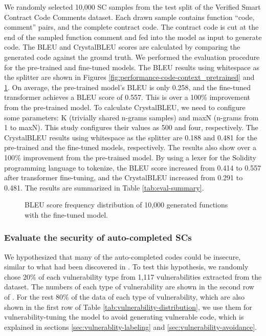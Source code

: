 \documentclass[12pt]{book}
\begin{document}
We randomly selected 10,000 SC samples from the test split of the Verified Smart Contract Code Comments dataset. Each drawn sample contains function ``code, comment'' pairs, and the complete contract code. The contract code is cut at the end of the sampled function comment and fed into the model as input to generate code. The BLEU and CrystalBLEU scores are calculated by comparing the generated code against the ground truth.  We performed the evaluation procedure for the pre-trained and fine-tuned models. The BLEU results using whitespace as the splitter are shown in Figures \ref{fig:performance-code-context_pretrained} and \ref{fig:performance-code-context_finetuned}. On average, the pre-trained model's BLEU is only 0.258, and the fine-tuned transformer achieves a BLEU score of 0.557. This is over a 100\% improvement from the pre-trained model. To calculate CrystalBLEU, we need to configure some parameters: K (trivially shared n-grams samples) and maxN (n-grams from 1 to maxN). This study configures their values as 500 and four, respectively. The CrystalBLEU results using whitespace as the splitter are 0.188 and 0.481 for the pre-trained and the fine-tuned models, respectively. The results also show over a 100\% improvement from the pre-trained model. By using a lexer for the Solidity programming language to tokenize, the BLEU score increased from 0.414 to 0.557 after transformer fine-tuning, and the CrystalBLEU increased from 0.291 to 0.481. The results are summarized in Table \ref{tab:eval-summary}. 


\begin{figure}[htp]
    \centering
    
    \caption{BLEU score frequency distribution of 10,000 generated functions with pre-trained model.}
    \label{fig:performance-code-context_pretrained}
    
    \caption{BLEU score frequency distribution of 10,000 generated functions with the fine-tuned model.}
    \label{fig:performance-code-context_finetuned}
\end{figure}


\subsubsection{Evaluate the security of auto-completed SCs}
\label{sec:eval-security-synthesis}
We hypothesized that many of the auto-completed codes could be insecure, similar to what had been discovered in \cite{chen2021codex}. To test this hypothesis, we randomly chose 20\% of each vulnerability type from 1,117 vulnerabilities extracted from the \cite{Hu2023} dataset. The numbers of each type of vulnerability are shown in the second row of . For the rest 80\% of the data of each type of vulnerability, which are also shown in the first row of Table \ref{tab:vulnerability-distribution}, we use them for vulnerability-tuning the model to avoid generating vulnerable code, which is explained in sections \ref{sec:vulnerablity-labeling} and \ref{sec:vulnerability-avoidance}. 
\end{document}
